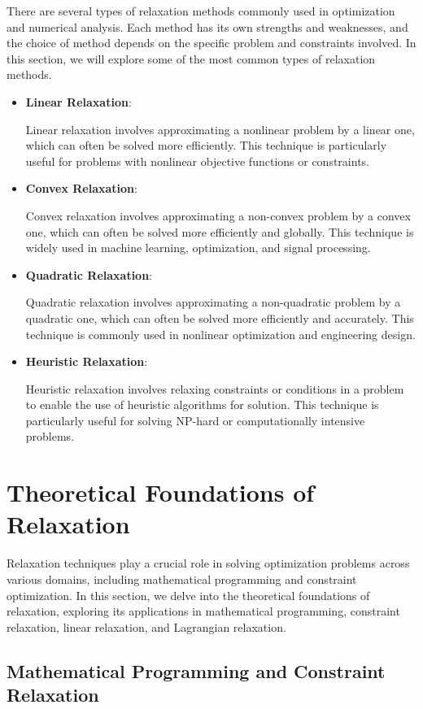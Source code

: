 \documentclass[12pt]{book} %
\begin{document}
There are several types of relaxation methods commonly used in optimization and numerical analysis. Each method has its own strengths and weaknesses, and the choice of method depends on the specific problem and constraints involved. In this section, we will explore some of the most common types of relaxation methods.
\begin{itemize}
    \item \textbf{Linear Relaxation}:

Linear relaxation involves approximating a nonlinear problem by a linear one, which can often be solved more efficiently. This technique is particularly useful for problems with nonlinear objective functions or constraints.
\item \textbf{Convex Relaxation}:

Convex relaxation involves approximating a non-convex problem by a convex one, which can often be solved more efficiently and globally. This technique is widely used in machine learning, optimization, and signal processing.
\item \textbf{Quadratic Relaxation}:

Quadratic relaxation involves approximating a non-quadratic problem by a quadratic one, which can often be solved more efficiently and accurately. This technique is commonly used in nonlinear optimization and engineering design.
\item \textbf{Heuristic Relaxation}:

Heuristic relaxation involves relaxing constraints or conditions in a problem to enable the use of heuristic algorithms for solution. This technique is particularly useful for solving NP-hard or computationally intensive problems.
\end{itemize}


\section{Theoretical Foundations of Relaxation}

Relaxation techniques play a crucial role in solving optimization problems across various domains, including mathematical programming and constraint optimization. In this section, we delve into the theoretical foundations of relaxation, exploring its applications in mathematical programming, constraint relaxation, linear relaxation, and Lagrangian relaxation.

\subsection{Mathematical Programming and Constraint Relaxation}
\end{document}
